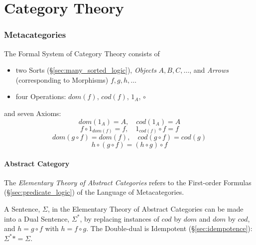 \part{Category Theory}\label{sec:category_theory}\cite{awodey06}\cite{maclane69}

\section{Metacategories}\label{sec:metacategory}

The Formal System of Category Theory consists of
\begin{itemize}
\item two Sorts (\S\ref{sec:many_sorted_logic}), \emph{Objects}
  $A,B,C,\ldots$, and \emph{Arrows} (corresponding to Morphisms)
  $f,g,h,\ldots$
\item four Operations: $dom(f)$, $cod(f)$, $1_A$, $\circ$
\end{itemize}
and seven Axioms:
\[
    dom(1_A) = A,\quad cod(1_A) = A
\]\[
    f \circ 1_{dom(f)} = f, \quad 1_{cod(f)} \circ f = f
\]\[
    dom(g\circ f) = dom(f), \quad cod(g \circ f) = cod(g)
\]\[
    h \circ (g \circ f) = (h \circ g) \circ f
\]



\subsection{Abstract Category}\label{sec:abstract_category}

The \emph{Elementary Theory of Abstract Categories} refers to the
First-order Formulas (\S\ref{sec:predicate_logic}) of the Language
of Metacategories.

A Sentence, $\Sigma$, in the Elementary Theory of Abstract Categories
can be made into a Dual Sentence, $\Sigma^*$, by replacing instances
of $cod$ by $dom$ and $dom$ by $cod$, and $h = g \circ f$ with $h = f
\circ g$. The Double-dual is Idempotent (\S\ref{sec:idempotence}):
$\Sigma^** = \Sigma$.

